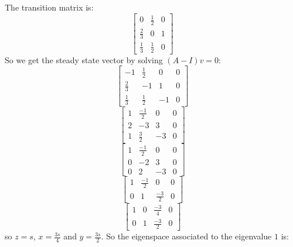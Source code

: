 \documentclass{article}
\begin{document}
\begin{Answer}
  The transition matrix is:
  \begin{equation*}
  \left[
  \begin{matrix}
  0 & \frac{1}{2} & 0\\
  \frac{2}{3} & 0 & 1\\
  \frac{1}{3} & \frac{1}{2} & 0
  \end{matrix}
  \right]
  \end{equation*}
  So we get the steady state vector by solving $(A-I)v = 0$:
  \begin{equation*}
  \left[
  \begin{array}{ccc|c}
  -1 & \frac{1}{2} & 0 & 0\\
  \frac{2}{3} & -1 & 1 & 0\\
  \frac{1}{3} & \frac{1}{2} & -1 & 0 
  \end{array}
  \right]
  \end{equation*}
  \begin{equation*}
  \left[
  \begin{array}{ccc|c}
  1 & \frac{-1}{2} & 0 & 0\\
  2 & -3 & 3 & 0\\
  1 & \frac{3}{2} & -3 & 0 
  \end{array}
  \right]
  \end{equation*}
  \begin{equation*}
  \left[
  \begin{array}{ccc|c}
  1 & \frac{-1}{2} & 0 & 0\\
  0 & -2 & 3 & 0\\
  0 & 2 & -3 & 0 
  \end{array}
  \right]
  \end{equation*}
  \begin{equation*}
  \left[
  \begin{array}{ccc|c}
  1 & \frac{-1}{2} & 0 & 0\\
  0 & 1 & \frac{-3}{2} & 0 
  \end{array}
  \right]
  \end{equation*}
    \begin{equation*}
  \left[
  \begin{array}{ccc|c}
  1 & 0 & \frac{-3}{4} & 0\\
  0 & 1 & \frac{-3}{2} & 0 
  \end{array}
  \right]
  \end{equation*}
  so $z = s$, $x = \frac{3s}{4}$ and $y = \frac{3s}{2}$.
  So the eigenspace associated to the eigenvalue $1$ is:

\end{Answer}
\end{document}
